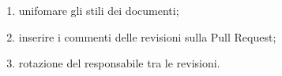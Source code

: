 \begin{enumerate}
    \item unifomare gli stili dei documenti;
    \item inserire i commenti delle revisioni sulla Pull Request;
    \item rotazione del responsabile tra le revisioni.
\end{enumerate}